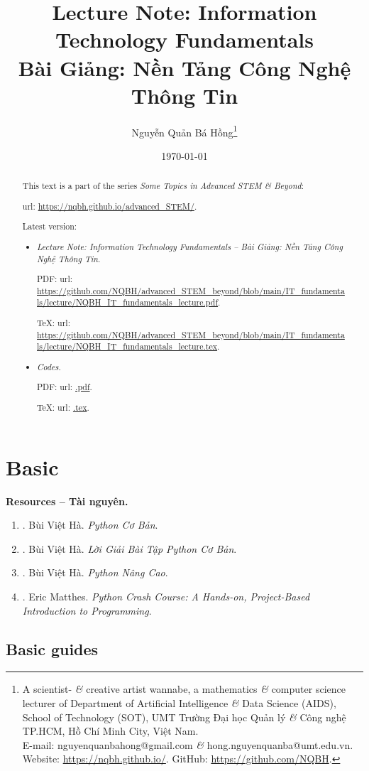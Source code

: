 \documentclass{article}
\title{Lecture Note: Information Technology Fundamentals\\Bài Giảng: Nền Tảng Công Nghệ Thông Tin}
\author{Nguyễn Quản Bá Hồng\footnote{A scientist- {\it\&} creative artist wannabe, a mathematics {\it\&} computer science lecturer of Department of Artificial Intelligence {\it\&} Data Science (AIDS), School of Technology (SOT), UMT Trường Đại học Quản lý {\it\&} Công nghệ TP.HCM, Hồ Chí Minh City, Việt Nam.\\E-mail: {\sf nguyenquanbahong@gmail.com} {\it\&} {\sf hong.nguyenquanba@umt.edu.vn}. Website: \url{https://nqbh.github.io/}. GitHub: \url{https://github.com/NQBH}.}}
\date{\today}
\begin{document}
\maketitle
\begin{abstract}
	This text is a part of the series {\it Some Topics in Advanced STEM \& Beyond}:
	
	{\sc url}: \url{https://nqbh.github.io/advanced_STEM/}.
	
	Latest version:
	\begin{itemize}
		\item {\it Lecture Note: Information Technology Fundamentals -- Bài Giảng: Nền Tảng Công Nghệ Thông Tin}.
		
		PDF: {\sc url}: \url{https://github.com/NQBH/advanced_STEM_beyond/blob/main/IT_fundamentals/lecture/NQBH_IT_fundamentals_lecture.pdf}.
		
		\TeX: {\sc url}: \url{https://github.com/NQBH/advanced_STEM_beyond/blob/main/IT_fundamentals/lecture/NQBH_IT_fundamentals_lecture.tex}.
		\item {\it Codes}.
		
		PDF: {\sc url}: \url{.pdf}.
		
		\TeX: {\sc url}: \url{.tex}.
	\end{itemize}
\end{abstract}
\tableofcontents


\section{Basic}
\textbf{\textsf{Resources -- Tài nguyên.}}
\begin{enumerate}
	\item \cite{Ha_Python_co_ban}. {\sc Bùi Việt Hà}. {\it Python Cơ Bản}.
	\item \cite{Ha_loi_giai_BT_Python_co_ban}. {\sc Bùi Việt Hà}. {\it Lời Giải Bài Tập Python Cơ Bản}.
	\item \cite{Ha_Python_nang_cao}. {\sc Bùi Việt Hà}. {\it Python Nâng Cao}.
	\item \cite{Matthes2019,Matthes2023}. {\sc Eric Matthes}. {\it Python Crash Course: A Hands-on, Project-Based Introduction to Programming}.
\end{enumerate}

\subsection{Basic guides}
\end{document}
